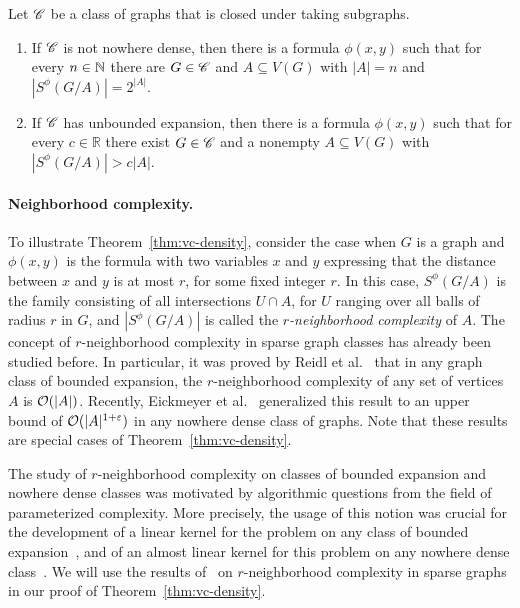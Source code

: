  \setcounter{vclower}{\value{theorem}}
 \begin{theorem}\label{thm:vc-density-lower-bound}
  Let $\mathscr{C}$ be a class of graphs that 
  is closed under taking subgraphs. 
  \begin{enumerate}
  \item If $\mathscr{C}$ is not nowhere dense, then there is a formula
    $\phi(x,y)$ such that for every $n\in \mathbb{N}$ there are $G\in\mathscr{C}$ and
    $A\subseteq V(G)$ with $|A|=n$ and $|S^\phi(G/A)|=2^{|A|}$.
  \item If $\mathscr{C}$ has unbounded expansion, then there is a formula
    $\phi(x,y)$ such that for every $c\in \mathbb{R}$ there exist
    $G\in\mathscr{C}$ and a nonempty $A\subseteq V(G)$ with
    $|S^\phi(G/A)|>c|A|$.
  \end{enumerate}
\end{theorem}

\paragraph{Neighborhood complexity.}
To illustrate Theorem~\ref{thm:vc-density}, consider the case when $G$
is a graph and~$\phi(x,y)$ is the formula with two variables $x$ and
$y$ expressing that the distance between $x$ and $y$ is at most $r$,
for some fixed integer $r$. In this case, $S^\phi(G/A)$ is the family
consisting of all intersections $U\cap A$, for $U$ ranging over all
balls of radius $r$ in $G$, and $|S^\phi(G/A)|$ is called the
\emph{$r$-neighborhood complexity} of $A$.  The concept of
$r$-neighborhood complexity in sparse graph classes has already been
studied before.  In particular, it was proved by Reidl et
al.~\cite{reidl2016characterising} that in any graph class of bounded
expansion, the $r$-neighborhood complexity of any set of vertices $A$
is $\mathcal{O}(|A|)$.  Recently, Eickmeyer et
al.~\cite{eickmeyer2016neighborhood} generalized this result to an
upper bound of $\mathcal{O}(|A|^{1+\varepsilon})$ in any nowhere dense class of
graphs.  Note that these results are special cases of
Theorem~\ref{thm:vc-density}.

\smallskip The study of $r$-neighborhood complexity on classes of
bounded expansion and nowhere dense classes was motivated by
algorithmic questions from the field of parameterized complexity.
More precisely, the usage of this notion was crucial for the
development of a linear kernel for the {}
problem on any class of bounded
expansion~\cite{drange2016kernelization}, and of an almost linear
kernel for this problem on any nowhere dense
class~\cite{eickmeyer2016neighborhood}.  We will use the results
of~\cite{drange2016kernelization,eickmeyer2016neighborhood,reidl2016characterising}
on $r$-neighborhood complexity in sparse graphs in our proof of
Theorem~\ref{thm:vc-density}.

